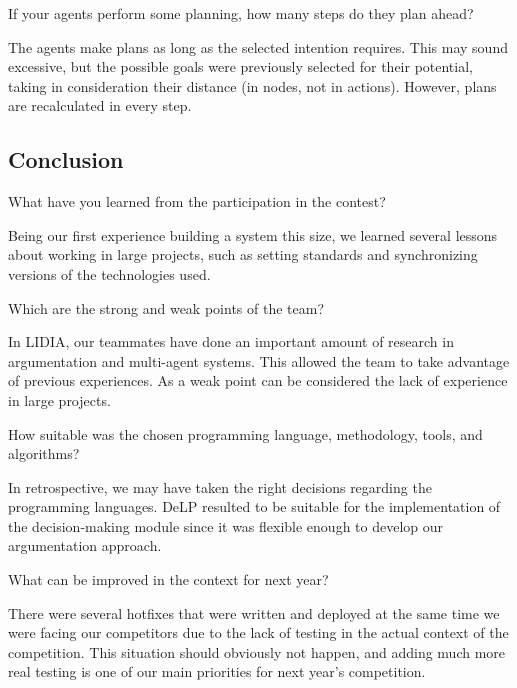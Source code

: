\begin{question}
If your agents perform some planning, how many steps do they plan ahead?
\end{question}

The agents make plans as long as the selected intention requires. This may
sound excessive, but the possible goals were previously selected for their
potential, taking in consideration their distance (in nodes, not in actions).
However, plans are recalculated in every step.

\subsection{Conclusion}
\setcounter{question}{0}

\begin{question}
What have you learned from the participation in the contest?
\end{question}

Being our first experience building a system this size, we learned several
lessons about working in large projects, such as setting standards and
synchronizing versions of the technologies used.

\begin{question}
Which are the strong and weak points of the team?
\end{question}

In LIDIA, our teammates have done an important amount of research in argumentation
and multi-agent systems. This allowed the team to take advantage of previous experiences. 
As a weak point can be considered the lack of experience in large projects.

\begin{question}  
How suitable was the chosen programming language, methodology, tools, and
algorithms?
\end{question}

In retrospective, we may have taken the right decisions regarding the programming languages. 
DeLP resulted to be suitable for the implementation of the decision-making module since
it was flexible enough to develop our argumentation approach.


\begin{question}
What can be improved in the context for next year?
\end{question}

There were several hotfixes that were written and deployed at the same time we
were facing our competitors due to the lack of testing in the actual context of
the competition. This situation should obviously not happen, and adding much
more real testing is one of our main priorities for next year's competition.


